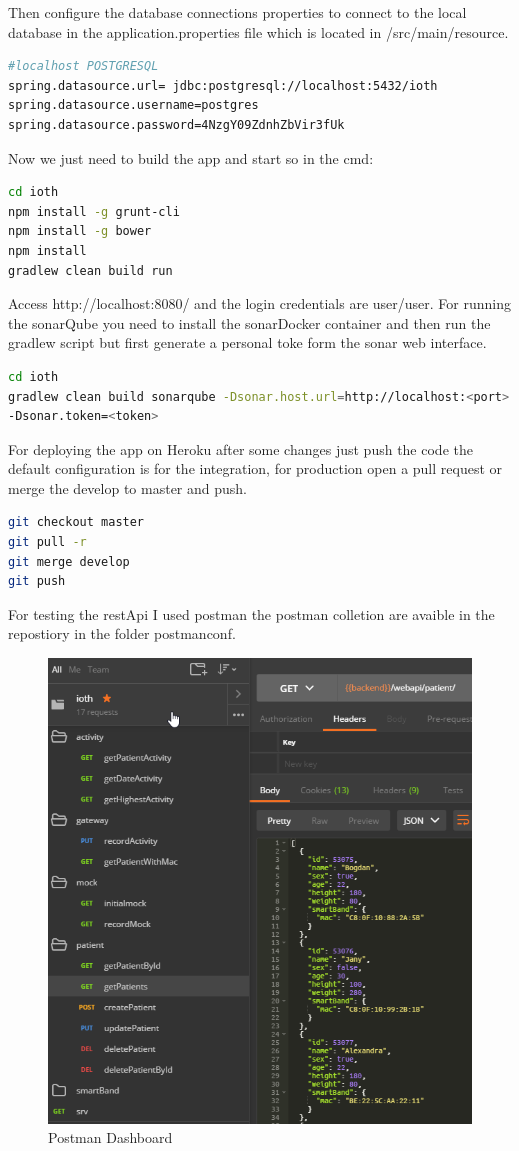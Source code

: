 Then configure the database connections properties to connect to the local database in the application.properties file which is located in /src/main/resource.
\begin{lstlisting}[language=Bash]
#localhost POSTGRESQL
spring.datasource.url= jdbc:postgresql://localhost:5432/ioth
spring.datasource.username=postgres
spring.datasource.password=4NzgY09ZdnhZbVir3fUk
\end{lstlisting}
\vspace{5mm}

Now we just need to build the app and start so in the cmd:
\begin{lstlisting}[language=Bash]
cd ioth
npm install -g grunt-cli
npm install -g bower
npm install
gradlew clean build run
\end{lstlisting}
\vspace{5mm}

Access http://localhost:8080/ and the login credentials are user/user. For running the sonarQube you need to install the sonarDocker container and then run the gradlew script but first generate a personal toke form the sonar web interface.
\begin{lstlisting}[language=Bash]
cd ioth
gradlew clean build sonarqube -Dsonar.host.url=http://localhost:<port>
-Dsonar.token=<token>
\end{lstlisting}
\vspace{5mm}

For deploying the app on Heroku after some changes just push the code the default configuration is for the integration, for production open a pull request or merge the develop to master and push.
\begin{lstlisting}[language=Bash]
git checkout master
git pull -r
git merge develop
git push
\end{lstlisting}

For testing the restApi I used postman the postman colletion are avaible in the repostiory in the folder postmanconf.
\begin{figure}[h]
	\centering
	\includegraphics[width=0.7\linewidth]{images/postman}
	\caption{Postman Dashboard}
	\label{fig:postman}
\end{figure}

